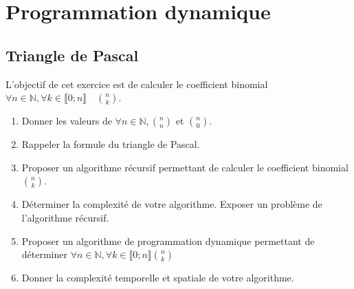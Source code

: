 \documentclass{article}
\newif\ifcorrection
\begin{document}
\section{Programmation dynamique}

\subsection{Triangle de Pascal}

L'objectif de cet exercice est de calculer le coefficient binomial $\forall n \in \mathbb{N}, \forall k \in \llbracket 0; n \rrbracket \quad \binom{n}{k}$.
\begin{enumerate}
    \item Donner les valeurs de $\forall n \in \mathbb{N}, \binom{n}{n}$ et $\binom{n}{0}$.
    \item Rappeler la formule du triangle de Pascal.
    \item Proposer un algorithme récursif permettant de calculer le coefficient binomial $\binom{n}{k}$.
    \item Déterminer la complexité de votre algorithme. Exposer un problème de l'algorithme récursif.
    \item Proposer un algorithme de programmation dynamique permettant de déterminer $\forall n \in \mathbb{N}, \forall k \in \llbracket 0; n \rrbracket \binom{n}{k}$
    \item Donner la complexité temporelle et spatiale de votre algorithme.
\end{enumerate}


\ifcorrection
\end{document}

